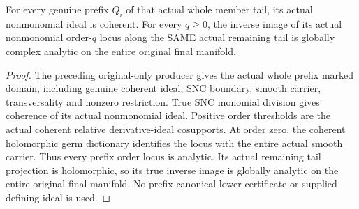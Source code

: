 \begin{theorem}
\label{hir:original-whole-member-prefix-coherent-analytic-producer}
\leanok
{}
For every genuine prefix $Q_i$ of that actual whole member tail, its actual
nonmonomial ideal is coherent. For every $q\ge0$, the inverse image of its
actual nonmonomial order-$q$ locus along the SAME actual remaining tail is
globally complex analytic on the entire original final manifold.
\end{theorem}
\begin{proof}
The preceding original-only producer gives the actual whole prefix marked
domain, including genuine coherent ideal, SNC boundary, smooth carrier,
transversality and nonzero restriction. True SNC monomial division gives
coherence of its actual nonmonomial ideal. Positive order thresholds are
the actual coherent relative derivative-ideal cosupports. At order zero,
the coherent holomorphic germ dictionary identifies the locus with the
entire actual smooth carrier. Thus every prefix order locus is analytic.
Its actual remaining tail projection is holomorphic, so its true inverse
image is globally analytic on the entire original final manifold. No
prefix canonical-lower certificate or supplied defining ideal is used.
\end{proof}

